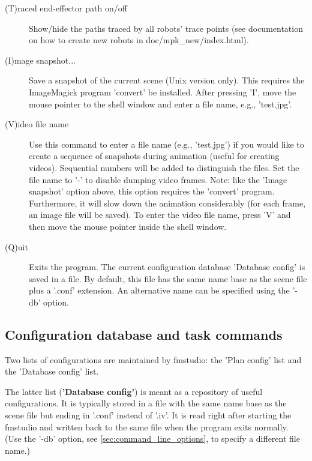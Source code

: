 \documentclass[letter,12pt]{article}
\begin{document}
\begin{description}
\item[(T)raced end-effector path on/off] Show/hide the paths traced by
  all robots' trace points (see documentation on how to create new
  robots in doc/mpk_new/index.html).
  
\item[(I)mage snapshot...] Save a snapshot of the current scene (Unix
  version only).  This requires the ImageMagick program 'convert' be
  installed.  After pressing 'I', move the mouse pointer to the shell
  window and enter a file name, e.g., 'test.jpg'.
  
\item[(V)ideo file name] Use this command to enter a file name (e.g.,
  'test.jpg') if you would like to create a sequence of snapshots
  during animation (useful for creating videos).  Sequential numbers
  will be added to distinguish the files.  Set the file name to '-' to
  disable dumping video frames.  Note: like the 'Image snapshot'
  option above, this option requires the 'convert' program.
  Furthermore, it will slow down the animation considerably (for each
  frame, an image file will be saved).  To enter the video file name,
  press 'V' and then move the mouse pointer inside the shell window.
  
\item[(Q)uit] Exits the program.  The current configuration database
  'Database config' is saved in a file.  By default, this file has
  the same name base as the scene file plus a '.conf' extension.  An
  alternative name can be specified using the '-db' option.

\end{description}



\subsection{Configuration database and task commands}
\label{sec:database_commands}

Two lists of configurations are maintained by fmstudio: the 'Plan
config' list and the 'Database config' list.

The latter list ({\bf 'Database config'}) is meant as a repository of
useful configurations.  It is typically stored in a file with the same
name base as the scene file but ending in '.conf' instead of '.iv'.
It is read right after starting the fmstudio and written back to the
same file when the program exits normally.  (Use the '-db' option, see
\ref{sec:command_line_options}, to specify a different file name.)
\end{document}

